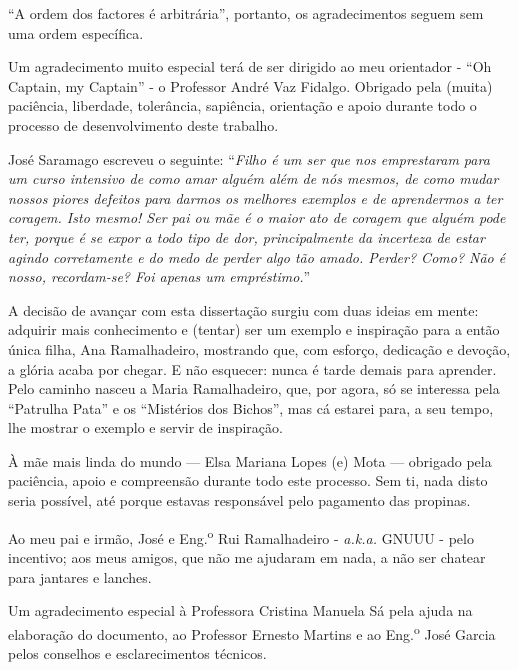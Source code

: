 
\begin{acknowledgements}
``A ordem dos factores é arbitrária'', portanto, os agradecimentos seguem sem uma ordem específica.

Um agradecimento muito especial terá de ser dirigido ao meu orientador - ``Oh Captain, my Captain'' - o Professor André Vaz Fidalgo. Obrigado pela (muita) paciência, liberdade, tolerância, sapiência, orientação e apoio durante todo o processo de desenvolvimento deste trabalho.

José Saramago escreveu o seguinte: ``\textit{Filho é um ser que nos emprestaram para um curso intensivo de como amar alguém além de nós mesmos, de como mudar nossos piores defeitos para darmos os melhores exemplos e de aprendermos a ter coragem. Isto mesmo! Ser pai ou mãe é o maior ato de coragem que alguém pode ter, porque é se expor a todo tipo de dor, principalmente da incerteza de estar agindo corretamente e do medo de perder algo tão amado. Perder? Como? Não é nosso, recordam-se? Foi apenas um empréstimo.}''

A decisão de avançar com esta dissertação surgiu com duas ideias em mente: adquirir mais conhecimento e (tentar) ser um exemplo e inspiração para a então única filha, Ana Ramalhadeiro, mostrando que, com esforço, dedicação e devoção, a glória acaba por chegar. E não esquecer: nunca é tarde demais para aprender. Pelo caminho nasceu a Maria Ramalhadeiro, que, por agora, só se interessa pela ``Patrulha Pata'' e os ``Mistérios dos Bichos'', mas cá estarei para, a seu tempo, lhe mostrar o exemplo e servir de inspiração.

À mãe mais linda do mundo — Elsa Mariana Lopes (e) Mota — obrigado pela paciência, apoio e compreensão durante todo este processo. Sem ti, nada disto seria possível, até porque estavas responsável pelo pagamento das propinas.

Ao meu pai e irmão, José e Eng.\textsuperscript{o} Rui Ramalhadeiro - \textit{a.k.a.} GNUUU - pelo incentivo; aos meus amigos, que não me ajudaram em nada, a não ser chatear para jantares e lanches.

Um agradecimento especial à Professora Cristina Manuela Sá pela ajuda na elaboração do documento, ao Professor Ernesto Martins e ao Eng.\textsuperscript{o} José Garcia pelos conselhos e esclarecimentos técnicos.

\end{acknowledgements}
